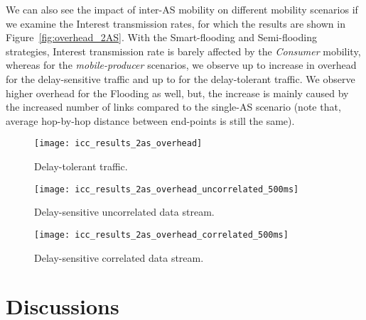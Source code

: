 \documentclass[conference]{IEEEtran}
\begin{document}
We can also see the impact of inter-AS mobility on different mobility scenarios if we examine the Interest transmission rates, for which the results are shown in Figure~\ref{fig:overhead_2AS}. With the Smart-flooding and Semi-flooding strategies, Interest transmission rate is barely affected by the \emph{Consumer} mobility, whereas for the \emph{mobile-producer} scenarios, we observe up to  increase in overhead for the delay-sensitive traffic and up to  for the delay-tolerant traffic. We observe higher overhead for the Flooding as well, but, the increase is mainly caused by the increased number of links compared to the single-AS scenario (note that, average hop-by-hop distance between end-points is still the same).
\begin{figure*}
        \centering
        \hspace{-0.15in}
          \begin{subfigure}[b]{0.3\textwidth}\centering
                \texttt{[image: icc\_results\_2as\_overhead]}\\
                \caption{Delay-tolerant traffic.}
                \label{DataOverhead2AS}
        \end{subfigure}
        \hspace{0.05in}
        \begin{subfigure}[b]{0.3\textwidth}\centering
               \texttt{[image: icc\_results\_2as\_overhead\_uncorrelated\_500ms]}\\
               \caption{Delay-sensitive uncorrelated data stream.}
               \label{UncorrelatedOverhead2AS}
        \end{subfigure}
        \hspace{0.05in}
        \begin{subfigure}[b]{0.3\textwidth}\centering
                \texttt{[image: icc\_results\_2as\_overhead\_correlated\_500ms]}\\
                \caption{Delay-sensitive correlated data stream.}
                \label{CorrelatedOverhead2AS}
        \end{subfigure}
        \caption{Average number of Interest messages transmitted per successfully received Data packet with inter-AS mobility ( for delay-sensitive scenario).}\label{fig:overhead_2AS}
\end{figure*}




\section{Discussions}\label{Section:Discussions}
\end{document}
